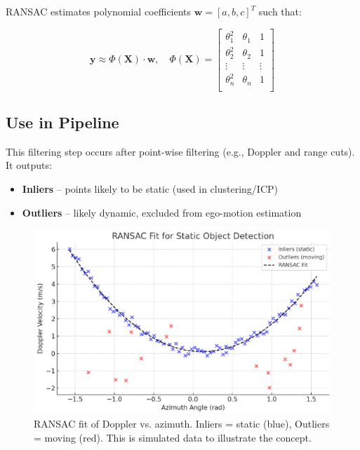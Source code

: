 RANSAC estimates polynomial coefficients $\mathbf{w} = [a, b, c]^T$ such that:

\[
\mathbf{y} \approx \Phi(\mathbf{X}) \cdot \mathbf{w}, \quad
\Phi(\mathbf{X}) = 
\begin{bmatrix}
\theta_1^2 & \theta_1 & 1 \\
\theta_2^2 & \theta_2 & 1 \\
\vdots & \vdots & \vdots \\
\theta_n^2 & \theta_n & 1 \\
\end{bmatrix}
\]

\subsection*{Use in Pipeline}

This filtering step occurs after point-wise filtering (e.g., Doppler and range cuts). It outputs:
\begin{itemize}
    \item \textbf{Inliers} – points likely to be static (used in clustering/ICP)
    \item \textbf{Outliers} – likely dynamic, excluded from ego-motion estimation
\end{itemize}

\begin{figure}[!htbp]
    \centering
    \includegraphics[width=1.0\linewidth]{images/RANSAC.png}
    \caption{RANSAC fit of Doppler vs. azimuth. Inliers = static (blue), Outliers = moving (red). This is simulated data to illustrate the concept.}
    \label{fig:ransac_static_dynamic}
\end{figure}

